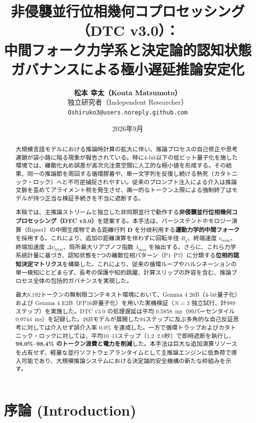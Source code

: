 \documentclass[11pt,a4paper]{article}
\title{\textbf{\Large 非侵襲並行位相幾何コプロセッシング（DTC v3.0）：\\中間フォーク力学系と決定論的認知状態ガバナンスによる極小遅延推論安定化}}
\author{\textbf{松本 幸太（Kouta Matsumoto）}\\[0.2em]
\normalsize 独立研究者（Independent Researcher）\\
\normalsize \texttt{Oshiruko3@users.noreply.github.com}}
\date{2026年9月}
\begin{document}
\maketitle

\begin{abstract}
\noindent 大規模言語モデルにおける推論時計算の拡大に伴い、推論プロセスの自己修正や思考連鎖が袋小路に陥る現象が報告されている。特に4-bit以下の低ビット量子化を施した環境では、離散化丸め誤差が高次元注意空間に人工的な極小値を形成する。その結果、同一の推論節を周回する循環膠着や、単一文字列を反復し続ける熱死（カタトニック・ロック）へと不可逆捕捉されやすい。従来のプロンプト注入による介入は推論文脈を歪めてアライメント税を発生させ、画一的なトークン上限による強制終了はモデルが持つ正当な検証手続きを不当に遮断する。

本稿では、主推論ストリームと独立した非同期並行で動作する\textbf{非侵襲並行位相幾何コプロセッシング（DTC v3.0）}を提案する。本手法は、パーシステントホモロジー演算（Ripser）の中間生成物である距離行列 $\mathbf{D}$ を分岐利用する\textbf{運動力学的中間フォーク}を採用する。これにより、追加の距離演算を伴わずに回転半径 $R_g$、終端速度 $v_{\mathrm{term}}$、終端加速度 $\Delta v_{\mathrm{term}}$、局所最大リアプノフ指数 $\lambda_{\max}$ を抽出する。さらに、これら力学系統計量に基づき、認知状態を7つの離散位相パターン（P1--P7）に分類する\textbf{位相的認知決定マトリクス}を構築した。これにより、従来の循環ループやハルシネーションの単一検知にとどまらず、長考の保護や知的跳躍、計算スリップの許容を含む、推論プロセス全体の包括的ガバナンスを実現した。

最大8,192トークンの無制限コンテキスト環境において、Gemma 4 26B（4-bit量子化）および Gemma 4 E2B（FP16非量子化）を用いた実機検証（$N=3$ 独立試行、計989ステップ）を実施した。DTC v3.0 の処理遅延は平均 0.5858~ms（99パーセンタイル 0.9744~ms）を記録した。26Bモデルが展開した94ステップに及ぶ多角的な自己反証思考に対しては介入せず誤介入率 0.0\% を達成した。一方で循環トラップおよびカタトニック・ロックに対しては、平均10--13ステップ（1.2--2.0秒）で即時遮断を執行し、\textbf{98.0\%--98.4\% のトークン浪費と電力を削減}した。本手法は巨大な追加演算リソースを占有せず、軽量な並行ソフトウェアランタイムとして主推論エンジンに低負荷で導入可能であり、大規模推論システムにおける決定論的安全機構の新たな枠組みを示す。
\end{abstract}

\vspace{1em}

\section{序論 (Introduction)}
\end{document}
